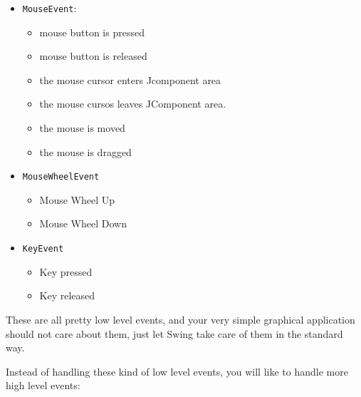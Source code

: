 \documentclass[a4paper, 9pt]{extarticle}
\begin{document}
\begin{itemize}

  \item \texttt{MouseEvent}:

    \begin{itemize}

      \item mouse button is pressed

      \item mouse button is released

      \item the mouse cursor enters Jcomponent area

      \item the mouse cursos leaves JComponent area.

      \item the mouse is moved

      \item the mouse is dragged

    \end{itemize}

  \item \texttt{MouseWheelEvent}

    \begin{itemize}

    \item Mouse Wheel Up

    \item Mouse Wheel Down

    \end{itemize}

  \item \texttt{KeyEvent}

    \begin{itemize}

    \item Key pressed

    \item Key released

    \end{itemize}

\end{itemize}

These are all pretty low level events, and your very simple graphical
application should not care about them, just let Swing take care of them in the
standard way.

Instead of handling these kind of low level events, you will like to handle
more high level events:
\end{document}
